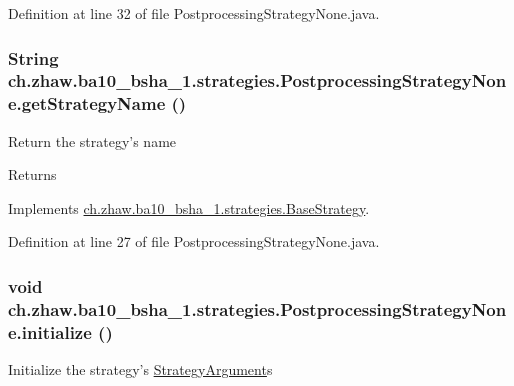 Definition at line 32 of file PostprocessingStrategyNone.java.\hypertarget{classch_1_1zhaw_1_1ba10__bsha__1_1_1strategies_1_1PostprocessingStrategyNone_a6c5447b46c9ddb6add9d5f3f21ac7721}{
\subsubsection[{getStrategyName}]{\setlength{\rightskip}{0pt plus 5cm}String ch.zhaw.ba10\_\-bsha\_\-1.strategies.PostprocessingStrategyNone.getStrategyName ()}}
\label{classch_1_1zhaw_1_1ba10__bsha__1_1_1strategies_1_1PostprocessingStrategyNone_a6c5447b46c9ddb6add9d5f3f21ac7721}
Return the strategy's name

\begin{DoxyReturn}{Returns}

\end{DoxyReturn}


Implements \hyperlink{classch_1_1zhaw_1_1ba10__bsha__1_1_1strategies_1_1BaseStrategy_aa0ebed55eed45409bad13d43a0058780}{ch.zhaw.ba10\_\-bsha\_\-1.strategies.BaseStrategy}.

Definition at line 27 of file PostprocessingStrategyNone.java.\hypertarget{classch_1_1zhaw_1_1ba10__bsha__1_1_1strategies_1_1PostprocessingStrategyNone_afb92557a36f60e5b88cce17eddc688d9}{
\subsubsection[{initialize}]{\setlength{\rightskip}{0pt plus 5cm}void ch.zhaw.ba10\_\-bsha\_\-1.strategies.PostprocessingStrategyNone.initialize ()}}
\label{classch_1_1zhaw_1_1ba10__bsha__1_1_1strategies_1_1PostprocessingStrategyNone_afb92557a36f60e5b88cce17eddc688d9}
Initialize the strategy's \hyperlink{classch_1_1zhaw_1_1ba10__bsha__1_1_1StrategyArgument}{StrategyArgument}s 

